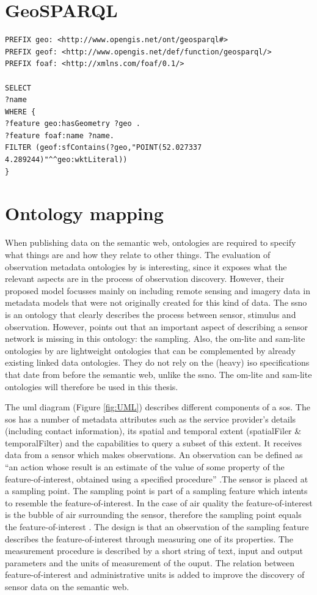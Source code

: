 \section{GeoSPARQL}

\begin{lstlisting}
PREFIX geo: <http://www.opengis.net/ont/geosparql#>
PREFIX geof: <http://www.opengis.net/def/function/geosparql/>
PREFIX foaf: <http://xmlns.com/foaf/0.1/> 

SELECT 
?name
WHERE {
?feature geo:hasGeometry ?geo .
?feature foaf:name ?name.
FILTER (geof:sfContains(?geo,"POINT(52.027337 4.289244)"^^geo:wktLiteral))
}
\end{lstlisting}

\section{Ontology mapping}
When publishing data on the semantic web, ontologies are required to specify what things are and how they relate to other things. The evaluation of observation metadata ontologies by \cite{SW:Hu} is interesting, since it exposes what the relevant aspects are in the process of observation discovery. However, their proposed model focusses mainly on including remote sensing and imagery data in metadata models that were not originally created for this kind of data. The \ac{ssno} is an ontology that clearly describes the process between sensor, stimulus and observation. However, \cite{SSW:Cox4} points out that an important aspect of describing a sensor network is missing in this ontology: the sampling. Also, the om-lite and sam-lite ontologies by \cite{SSW:Cox4} are lightweight ontologies that can be complemented by already existing linked data ontologies. They do not rely on the (heavy) \ac{iso} specifications that date from before the semantic web, unlike the \ac{ssno}. The om-lite and sam-lite ontologies will therefore be used in this thesis. 

The \ac{uml} diagram (Figure \ref{fig:UML}) describes different components of a \ac{sos}. The \ac{sos} has a number of metadata attributes such as the service provider's details (including contact information), its spatial and temporal extent (spatialFiler \& temporalFilter) and the capabilities to query a subset of this extent. It receives data from a sensor which makes observations. An observation can be defined as \enquote{an action whose result is an estimate of the value of some property of the feature-of-interest, obtained using a specified procedure} \citep{SSW:Cox3}.The sensor is placed at a sampling point. The sampling point is part of a sampling feature which intents to resemble the feature-of-interest. In the case of air quality the feature-of-interest is the bubble of air surrounding the sensor, therefore the sampling point equals the feature-of-interest \citep{SDI:INSPIRE2}. The design is that an observation of the sampling feature describes the  feature-of-interest through measuring one of its properties. The measurement procedure is described by a short string of text, input and output parameters and the units of measurement of the ouput. The relation between feature-of-interest and administrative units is added to improve the discovery of sensor data on the semantic web. 

